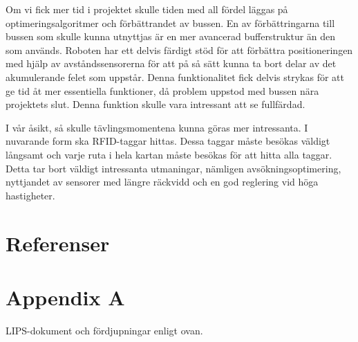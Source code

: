 \documentclass[a4paper,12pt,fleqn]{article}
\begin{document}
Om vi fick mer tid i projektet skulle tiden med all fördel läggas på optimeringsalgoritmer och förbättrandet av bussen. En av förbättringarna till bussen som skulle kunna utnyttjas är en mer avancerad bufferstruktur än den som används.
Roboten har ett delvis färdigt stöd för att förbättra positioneringen med hjälp av avståndssensorerna för att på så sätt kunna ta bort delar av det akumulerande felet som uppstår. Denna funktionalitet fick delvis strykas för att ge tid åt mer essentiella funktioner, då problem uppstod med bussen nära projektets slut. Denna funktion skulle vara intressant att se fullfärdad.  

I vår åsikt, så skulle tävlingsmomentena kunna göras mer intressanta. I nuvarande form ska RFID-taggar hittas. Dessa taggar måste besökas väldigt långsamt och varje ruta i hela kartan måste besökas för att hitta alla taggar. Detta tar bort väldigt intressanta utmaningar, nämligen avsökningsoptimering, nyttjandet av sensorer med längre räckvidd och en god reglering vid höga hastigheter.


\section{Referenser}



\newpage
\appendix
\pagestyle{empty}
\section{Appendix A}


%

%

\label{komuppg.}
LIPS-dokument och fördjupningar enligt ovan.
\end{document}

